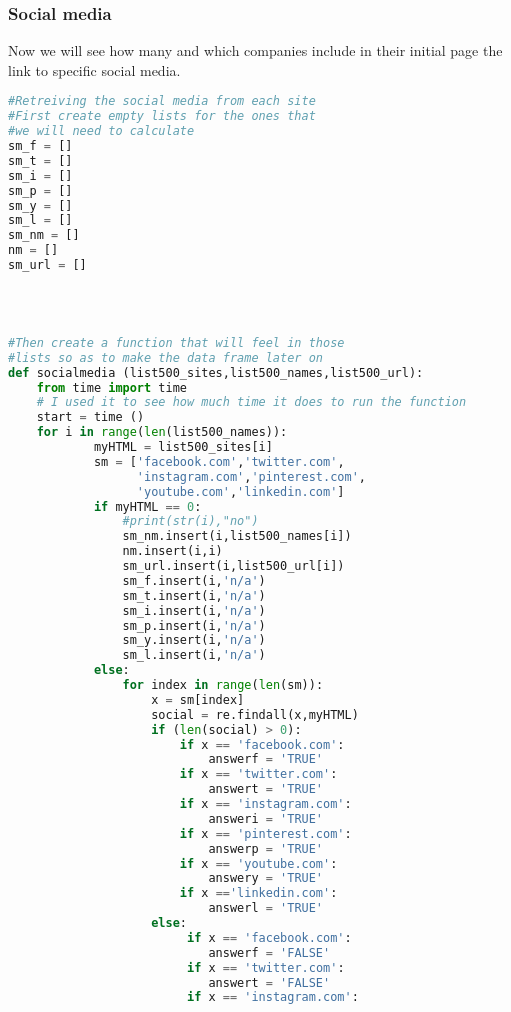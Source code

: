 \documentclass{article}
\begin{document}
\subsubsection{Social media}
Now we will see how many and which companies include in their initial page the link to specific social media.
\begin{lstlisting}[language=Python]
#Retreiving the social media from each site
#First create empty lists for the ones that 
#we will need to calculate
sm_f = []
sm_t = []
sm_i = []
sm_p = []
sm_y = []
sm_l = []   
sm_nm = [] 
nm = []
sm_url = []
 


 
#Then create a function that will feel in those 
#lists so as to make the data frame later on
def socialmedia (list500_sites,list500_names,list500_url):
    from time import time 
    # I used it to see how much time it does to run the function
    start = time ()
    for i in range(len(list500_names)):        
            myHTML = list500_sites[i]
            sm = ['facebook.com','twitter.com',
                  'instagram.com','pinterest.com',
                  'youtube.com','linkedin.com'] 
            if myHTML == 0:
                #print(str(i),"no")
                sm_nm.insert(i,list500_names[i]) 
                nm.insert(i,i)
                sm_url.insert(i,list500_url[i])
                sm_f.insert(i,'n/a')
                sm_t.insert(i,'n/a')
                sm_i.insert(i,'n/a')
                sm_p.insert(i,'n/a')
                sm_y.insert(i,'n/a')
                sm_l.insert(i,'n/a')
            else:
                for index in range(len(sm)):
                    x = sm[index]
                    social = re.findall(x,myHTML)                                
                    if (len(social) > 0):
                        if x == 'facebook.com':
                            answerf = 'TRUE'
                        if x == 'twitter.com':
                            answert = 'TRUE'
                        if x == 'instagram.com':
                            answeri = 'TRUE'
                        if x == 'pinterest.com':
                            answerp = 'TRUE'
                        if x == 'youtube.com':
                            answery = 'TRUE'
                        if x =='linkedin.com':
                            answerl = 'TRUE'                   
                    else:
                         if x == 'facebook.com':
                            answerf = 'FALSE'
                         if x == 'twitter.com':
                            answert = 'FALSE'
                         if x == 'instagram.com':

\end{lstlisting}
\end{document}
